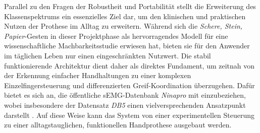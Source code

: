    Parallel zu den Fragen der Robustheit und Portabilität stellt die Erweiterung des Klassenspektrums ein essenzielles Ziel dar, um den klinischen und praktischen Nutzen der Prothese im Alltag zu erweitern. Während sich die \textit{Schere, Stein, Papier}-Gesten in dieser Projektphase als hervorragendes Modell für eine wissenschaftliche Machbarkeitsstudie erwiesen hat, bieten sie für den Anwender im täglichen Leben nur einen eingeschränkten Nutzwert. Die stabil funktionierende Architektur dient daher als direktes Fundament, um zeitnah von der Erkennung einfacher Handhaltungen zu einer komplexen Einzelfingersteuerung und differenzierten Greif-Koordination überzugehen. Dafür bietet es sich an, die öffentliche \ac{sEMG}-Datenbank \textit{Ninapro} mit einzubeziehen, wobei insbesondere der Datensatz \textit{DB5} einen vielversprechenden Ansatzpunkt darstellt \cite{ninapro_website,pizzolato2017comparison}. Auf diese Weise kann das System von einer experimentellen Steuerung zu einer alltagstauglichen, funktionellen Handprothese ausgebaut werden.    
